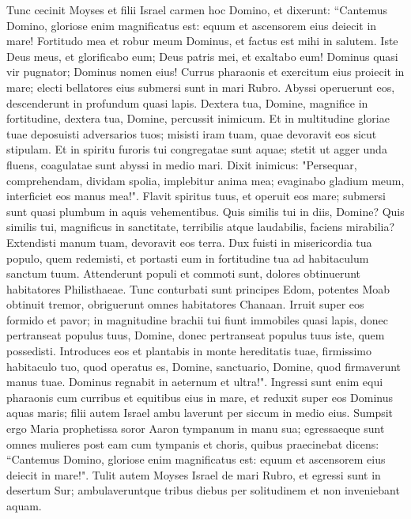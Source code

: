 \begin{biblechapter}  
\verse Tunc cecinit Moyses et filii Israel carmen hoc Domino, et dixerunt: “Cantemus Domino, gloriose enim magnificatus est: equum et ascensorem eius deiecit in mare! 
\verse Fortitudo mea et robur meum Dominus, et factus est mihi in salutem. Iste Deus meus, et glorificabo eum; Deus patris mei, et exaltabo eum! 
\verse Dominus quasi vir pugnator; Dominus nomen eius! 
\verse Currus pharaonis et exercitum eius proiecit in mare; electi bellatores eius submersi sunt in mari Rubro. 
\verse Abyssi operuerunt eos, descenderunt in profundum quasi lapis. 
\verse Dextera tua, Domine, magnifice in fortitudine, dextera tua, Domine, percussit inimicum. 
\verse Et in multitudine gloriae tuae deposuisti adversarios tuos; misisti iram tuam, quae devoravit eos sicut stipulam. 
\verse Et in spiritu furoris tui congregatae sunt aquae; stetit ut agger unda fluens, coagulatae sunt abyssi in medio mari. 
\verse Dixit inimicus: "Persequar, comprehendam, dividam spolia, implebitur anima mea; evaginabo gladium meum, interficiet eos manus mea!". 
\verse Flavit spiritus tuus, et operuit eos mare; submersi sunt quasi plumbum in aquis vehementibus. 
\verse Quis similis tui in diis, Domine? Quis similis tui, magnificus in sanctitate, terribilis atque laudabilis, faciens mirabilia? 
\verse Extendisti manum tuam, devoravit eos terra. 
\verse Dux fuisti in misericordia tua populo, quem redemisti, et portasti eum in fortitudine tua ad habitaculum sanctum tuum. 
\verse Attenderunt populi et commoti sunt, dolores obtinuerunt habitatores Philisthaeae. 
\verse Tunc conturbati sunt principes Edom, potentes Moab obtinuit tremor, obriguerunt omnes habitatores Chanaan. 
\verse Irruit super eos formido et pavor; in magnitudine brachii tui fiunt immobiles quasi lapis, donec pertranseat populus tuus, Domine, donec pertranseat populus tuus iste, quem possedisti. 
\verse Introduces eos et plantabis in monte hereditatis tuae, firmissimo habitaculo tuo, quod operatus es, Domine, sanctuario, Domine, quod firmaverunt manus tuae. 
\verse Dominus regnabit in aeternum et ultra!". 
\verse Ingressi sunt enim equi pharaonis cum curribus et equitibus eius in mare, et reduxit super eos Dominus aquas maris; filii autem Israel ambu laverunt per siccum in medio eius. 
\verse Sumpsit ergo Maria prophetissa soror Aaron tympanum in manu sua; egressaeque sunt omnes mulieres post eam cum tympanis et choris,  
\verse quibus praecinebat dicens: “Cantemus Domino, gloriose enim magnificatus est: equum et ascensorem eius deiecit in mare!". 
\verse Tulit autem Moyses Israel de mari Rubro, et egressi sunt in desertum Sur; ambulaveruntque tribus diebus per solitudinem et non inveniebant aquam. 

\end{biblechapter}
